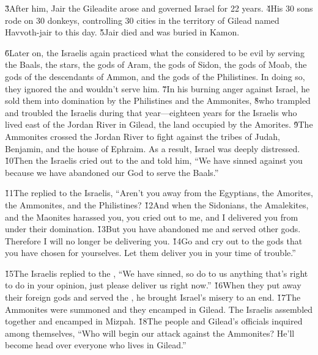 \v{3}After him, Jair the Gileadite arose and governed Israel for 22 years. \v{4}His 30 sons rode on 30 donkeys, controlling 30 cities in the territory of Gilead named Havvoth-jair to this day. \v{5}Jair died and was buried in Kamon.

\v{6}Later on, the Israelis again practiced what the  considered to be evil by serving the Baals, the stars, the gods of Aram, the gods of Sidon, the gods of Moab, the gods of the descendants of Ammon, and the gods of the Philistines. In doing so, they ignored the  and wouldn't serve him. \v{7}In his burning anger against Israel, he sold them into domination by the Philistines and the Ammonites, \v{8}who trampled and troubled the Israelis during that year---eighteen years for the Israelis who lived east of the Jordan River in Gilead, the land occupied by the Amorites. \v{9}The Ammonites crossed the Jordan River to fight against the tribes of Judah, Benjamin, and the house of Ephraim. As a result, Israel was deeply distressed. \v{10}Then the Israelis cried out to the  and told him, ``We have sinned against you because we have abandoned our God to serve the Baals.''

\v{11}The  replied to the Israelis, ``Aren't you away from the Egyptians, the Amorites, the Ammonites, and the Philistines? \v{12}And when the Sidonians, the Amalekites, and the Maonites harassed you, you cried out to me, and I delivered you from under their domination. \v{13}But you have abandoned me and served other gods. Therefore I will no longer be delivering you. \v{14}Go and cry out to the gods that you have chosen for yourselves. Let them deliver you in your time of trouble.''

\v{15}The Israelis replied to the , ``We have sinned, so do to us anything that's right to do in your opinion, just please deliver us right now.'' \v{16}When they put away their foreign gods and served the , he brought Israel's misery to an end. \v{17}The Ammonites were summoned and they encamped in Gilead. The Israelis assembled together and encamped in Mizpah. \v{18}The people and Gilead's officials inquired among themselves, ``Who will begin our attack against the Ammonites? He'll become head over everyone who lives in Gilead.''

